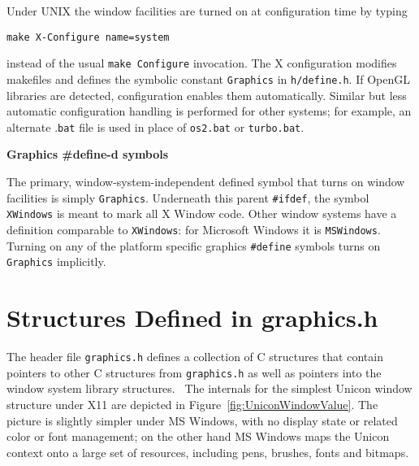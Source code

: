 Under UNIX the window facilities are turned on at configuration time by typing

\texttt{make X-Configure name=system}

\noindent instead of the usual \texttt{make Configure} invocation. The
X configuration modifies makefiles and defines the symbolic constant
\texttt{Graphics} in \texttt{h/define.h}. If OpenGL libraries are
detected, configuration enables them automatically. Similar but less
automatic configuration handling is performed for other systems; for
example, an alternate .\texttt{bat} file is used in place of
\texttt{os2.bat} or \texttt{turbo.bat}.

{\sffamily
\textbf{Graphics \#define{}-d symbols}}

The primary, window-system-independent defined symbol that turns on
window facilities is simply \texttt{Graphics}.  Underneath this parent
\texttt{\#ifdef}, the symbol \texttt{XWindows} is meant to mark all X
Window code. Other window systems have a definition comparable to
\texttt{XWindows}: for Microsoft Windows it is \texttt{MSWindows}.
Turning on any of the platform specific graphics
\texttt{\#define} symbols turns on \texttt{Graphics} implicitly.

\section{Structures Defined in graphics.h}

The header file \texttt{graphics.h} defines a collection of C
structures that contain pointers to other C structures from
\texttt{graphics.h} as well as pointers into the window system library
structures. \ The internals for the simplest Unicon window structure
under X11 are depicted in Figure~\ref{fig:UniconWindowValue}.
The picture is slightly simpler
under MS Windows, with no display state or related color or font
management; on the other hand MS Windows maps the Unicon context onto
a large set of resources, including pens, brushes, fonts and bitmaps.

